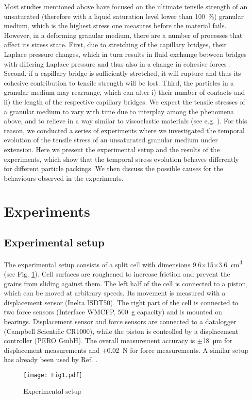 Most studies mentioned above have focused on the ultimate tensile strength of an unsaturated (therefore with a liquid saturation level lower than 100~\%) granular medium, which is the highest stress one measures before the material fails. However, in a deforming granular medium, there are a number of processes that affect its stress state. First, due to stretching of the capillary bridges, their Laplace pressure changes, which in turn results in fluid exchange between bridges with differing Laplace pressure and thus also in a change in cohesive forces \cite{Herminghaus2005,Kohonen2004,Mani2015,Scheel2008JP}. Second, if a capillary bridge is sufficiently stretched, it will rupture and thus its cohesive contribution to tensile strength will be lost. Third, the particles in a granular medium may rearrange, which can alter i) their number of contacts and ii) the length of the respective capillary bridges. We expect the tensile stresses of a granular medium to vary with time due to interplay among the phenomena above, and to relieve in a way similar to viscoelastic materials (see e.g. \cite{Francois2012}). For this reason, we conducted a series of experiments where we investigated the temporal evolution of the tensile stress of an unsaturated granular medium under extension. Here we present the experimental setup and the results of the experiments, which show that the temporal stress evolution behaves differently for different particle packings. We then discuss the possible causes for the behaviours observed in the experiments.


\section{Experiments}
\label{sec:Experiments}

\subsection{Experimental setup}
\label{sec:Experimental setup}

The experimental setup consists of a split cell with dimensions 9.6$\times$15$\times$3.6~\si{\centi\metre^3} (see Fig. \ref{Setup}). Cell surfaces are roughened to increase friction and prevent the grains from sliding against them. The left half of the cell is connected to a piston, which can be moved at arbitrary speeds. Its movement is measured with a displacement sensor (Inelta ISDT50). The right part of the cell is connected to two force sensors (Interface WMCFP, 500~\si{\gram} capacity) and is mounted on bearings. Displacement sensor and force sensors are connected to a datalogger (Campbell Scientific CR1000), while the piston is controlled by a displacement controller (PERO GmbH). The overall measurement accuracy is $\pm$18~\si{\micro\metre} for displacement measurements and $\pm$0.02~\si{N} for force measurements. A similar setup has already been used by Ref. \cite{Pierrat1997}.
\begin{figure}
\texttt{[image: Fig1.pdf]}
\caption{Experimental setup}
\label{Setup}
\end{figure}

